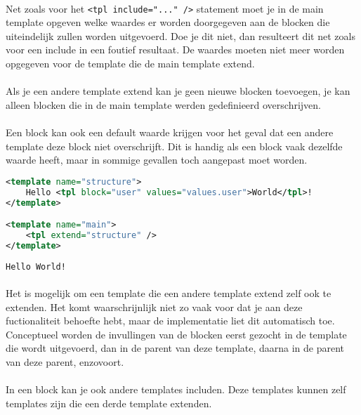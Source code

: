\paragraph {} Net zoals voor het \lstinline{<tpl include="..." />} statement moet je in de
main template opgeven welke waardes er worden doorgegeven aan de blocken die uiteindelijk
zullen worden uitgevoerd. Doe je dit niet, dan resulteert dit net zoals voor een include
in een foutief resultaat. De waardes moeten niet meer worden opgegeven voor de template
die de main template extend.

\paragraph {} Als je een andere template extend kan je geen nieuwe blocken toevoegen, je
kan alleen blocken die in de main template werden gedefinieerd overschrijven.

\paragraph {} Een block kan ook een default waarde krijgen voor het geval dat een andere
template deze block niet overschrijft. Dit is handig als een block vaak dezelfde waarde
heeft, maar in sommige gevallen toch aangepast moet worden.

\begin{lstlisting}[language=xml]
<template name="structure">
	Hello <tpl block="user" values="values.user">World</tpl>!
</template>

<template name="main">
	<tpl extend="structure" />
</template>
\end{lstlisting}

\begin{lstlisting}
Hello World!
\end{lstlisting}

\paragraph {} Het is mogelijk om een template die een andere template extend zelf ook te
extenden. Het komt waarschrijnlijk niet zo vaak voor dat je aan deze fuctionaliteit
behoefte hebt, maar de implementatie liet dit automatisch toe. Conceptueel worden de
invullingen van de blocken eerst gezocht in de template die wordt uitgevoerd, dan in de
parent van deze template, daarna in de parent van deze parent, enzovoort.

\paragraph {} In een block kan je ook andere templates includen. Deze templates kunnen
zelf templates zijn die een derde template extenden.

